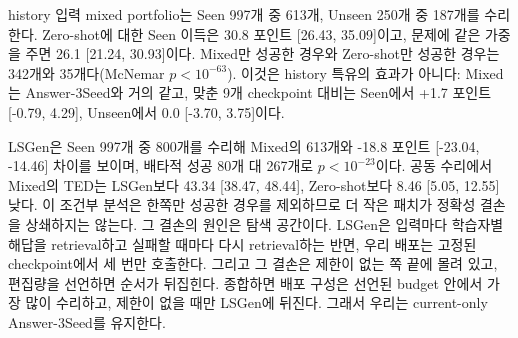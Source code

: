 \documentclass[10pt,conference]{IEEEtran}
\begin{document}
history 입력 mixed portfolio는 Seen 997개 중 613개, Unseen 250개 중 187개를 수리한다. Zero-shot에 대한 Seen 이득은 30.8 포인트 [26.43, 35.09]이고, 문제에 같은 가중을 주면 26.1 [21.24, 30.93]이다. Mixed만 성공한 경우와 Zero-shot만 성공한 경우는 342개와 35개다(McNemar \(p<10^{-63}\)). 이것은 history 특유의 효과가 아니다: Mixed는 Answer-3Seed와 거의 같고, 맞춘 9개 checkpoint 대비는 Seen에서 +1.7 포인트 [-0.79, 4.29], Unseen에서 0.0 [-3.70, 3.75]이다.

LSGen은 Seen 997개 중 800개를 수리해 Mixed의 613개와 -18.8 포인트 [-23.04, -14.46] 차이를 보이며, 배타적 성공 80개 대 267개로 \(p<10^{-23}\)이다. 공동 수리에서 Mixed의 TED는 LSGen보다 43.34 [38.47, 48.44], Zero-shot보다 8.46 [5.05, 12.55] 낮다. 이 조건부 분석은 한쪽만 성공한 경우를 제외하므로 더 작은 패치가 정확성 결손을 상쇄하지는 않는다. 그 결손의 원인은 탐색 공간이다. LSGen은 입력마다 학습자별 해답을 retrieval하고 실패할 때마다 다시 retrieval하는 반면, 우리 배포는 고정된 checkpoint에서 세 번만 호출한다. 그리고 그 결손은 제한이 없는 쪽 끝에 몰려 있고, 편집량을 선언하면 순서가 뒤집힌다. 종합하면 배포 구성은 선언된 budget 안에서 가장 많이 수리하고, 제한이 없을 때만 LSGen에 뒤진다. 그래서 우리는 current-only Answer-3Seed를 유지한다.
\end{document}
